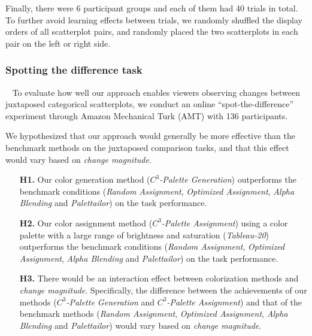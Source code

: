 {Finally, there were $6$ participant groups and each of them had $40$ trials in total. To further avoid learning effects between trials, we randomly shuffled the display orders of all scatterplot pairs, and randomly placed the two scatterplots in each pair on the left or right side.

\subsubsection{Spotting the difference task}
\
\newline
To evaluate how well our approach enables viewers observing changes between juxtaposed categorical scatterplots, we conduct an online ``spot-the-difference'' experiment through Amazon Mechanical Turk (AMT) with 136 participants.

\vspace{.3em}
 We hypothesized that our approach would generally be more effective than the benchmark methods on the juxtaposed comparison tasks, and that this effect would vary based on \emph{change magnitude}.
\begin{itemize}[noitemsep]
\setlength{\itemsep}{5pt}
    \item[\textbf{H1.}] Our color generation method (\emph{$C^3$-Palette Generation}) outperforms the benchmark conditions (\emph{Random Assignment}, \emph{Optimized Assignment}, \emph{Alpha Blending} and \emph{Palettailor}) on the task performance.

    \item [\textbf{H2.}] Our color assignment method (\emph{$C^3$-Palette Assignment}) using a color palette with a large range of brightness and saturation (\emph{Tableau-20}) outperforms the benchmark conditions (\emph{Random Assignment}, \emph{Optimized Assignment}, \emph{Alpha Blending} and \emph{Palettailor}) on the task performance.

    \item [\textbf{H3.}] There would be an interaction effect between colorization methods and \emph{change magnitude}. Specifically, the difference between the achievements of our methods (\emph{$C^3$-Palette Generation} and \emph{$C^3$-Palette Assignment}) and that of the benchmark methods (\emph{Random Assignment}, \emph{Optimized Assignment}, \emph{Alpha Blending} and \emph{Palettailor}) would vary based on \emph{change magnitude}.
\end{itemize}

}
